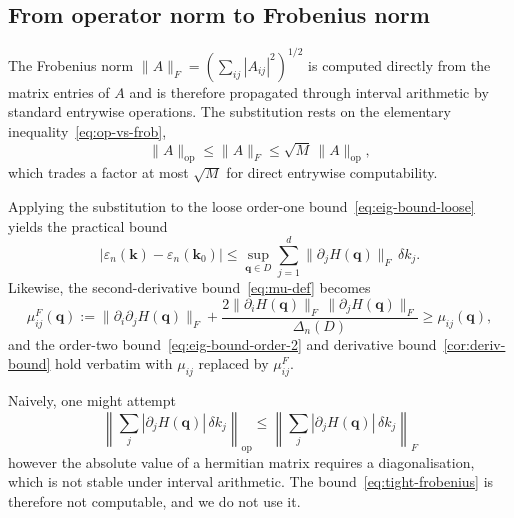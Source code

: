 \documentclass[11pt]{article}
\numberwithin{equation}{section}
\begin{document}
\subsection{From operator norm to Frobenius norm}\label{sec:frobenius-substitution}

The Frobenius norm \(\|A\|_F = (\sum_{ij} |A_{ij}|^2)^{1/2}\) is computed
directly from the matrix entries of \(A\) and is therefore propagated through
interval arithmetic by standard entrywise operations. The substitution rests
on the elementary inequality~\eqref{eq:op-vs-frob},
\begin{equation}
    \|A\|_\mathrm{op} \leq \|A\|_F \leq \sqrt{M}\,\|A\|_\mathrm{op},
\end{equation}
which trades a factor at most \(\sqrt{M}\) for direct entrywise computability.

Applying the substitution to the loose order-one
bound~\eqref{eq:eig-bound-loose} yields the practical bound
\begin{equation}
    |\varepsilon_n(\mathbf{k}) - \varepsilon_n(\mathbf{k}_0)|
    \leq \sup_{\mathbf{q} \in D}
    \sum_{j=1}^d \|\partial_j H(\mathbf{q})\|_F\, \delta k_j.
    \label{eq:eig-bound-frobenius}
\end{equation}
Likewise, the second-derivative bound~\eqref{eq:mu-def} becomes
\begin{equation}
    \mu_{ij}^F(\mathbf{q})
    := \|\partial_i \partial_j H(\mathbf{q})\|_F
    + \frac{2 \|\partial_i H(\mathbf{q})\|_F\,
        \|\partial_j H(\mathbf{q})\|_F}{\Delta_n(D)}
    \geq \mu_{ij}(\mathbf{q}),
\end{equation}
and the order-two bound~\eqref{eq:eig-bound-order-2} and derivative
bound~\autoref{cor:deriv-bound} hold verbatim with \(\mu_{ij}\) replaced by
\(\mu_{ij}^F\).

\begin{remark}\label{rem:tight-frobenius}
    Naively, one might attempt
    \begin{equation}
        \left\| \sum_j |\partial_j H(\mathbf{q})|\, \delta k_j
        \right\|_\mathrm{op}
        \leq \left\| \sum_j |\partial_j H(\mathbf{q})|\, \delta k_j
        \right\|_F
        \label{eq:tight-frobenius}
    \end{equation}
    however the absolute value of a hermitian matrix requires a diagonalisation, which is
    not stable under interval arithmetic. The bound~\eqref{eq:tight-frobenius} is
    therefore not computable, and we do not use it.
\end{remark}
\end{document}

